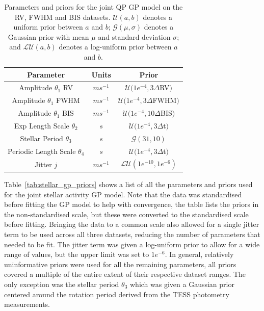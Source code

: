 \begin{table}[htb]
    \centering
    \begin{tabular}{ccc}
        \toprule
        \toprule
        Parameter & Units & Prior \\
        \midrule
        Amplitude $\theta_{1}$ RV & $ms^{-1}$ & $\mathcal{U}(1e^{-4}, 3 \Delta$RV$)$ \\
        \addlinespace
        Amplitude $\theta_{1}$ FWHM & $ms^{-1}$ & $\mathcal{U}(1e^{-4}, 3 \Delta$FWHM$)$  \\
        \addlinespace
        Amplitude $\theta_{1}$ BIS & $ms^{-1}$ & $\mathcal{U}(1e^{-4}, 10 \Delta$BIS$)$ \\
        \addlinespace
        Exp Length Scale $\theta_{2}$ & $s$ & $\mathcal{U}(1e^{-4}, 3 \Delta$t$)$ \\
        \addlinespace
        Stellar Period $\theta_{3}$ & $s$ & $\mathcal{G}(31, 10)$ \\
        \addlinespace
        Periodic Length Scale $\theta_{4}$ & $s$ & $\mathcal{U}(1e^{-4}, 3 \Delta$t$)$ \\
        \addlinespace
        Jitter $j$ & $ms^{-1}$ & $\mathcal{LU}(1e^{-10}, 1e^{-6})$ \\
        \bottomrule
    \end{tabular}
    \caption{Parameters and priors for the joint QP GP model on the RV, FWHM and BIS datasets.
    $\mathcal{U}(a, b)$ denotes a uniform prior between $a$ and $b$; $\mathcal{G}(\mu, \sigma)$ denotes a Gaussian prior
    with mean $\mu$ and standard deviation $\sigma$; and $\mathcal{LU}(a, b)$ denotes a log-uniform prior between $a$ and $b$.}
    \label{tab:stellar_gp_priors}
\end{table}

Table~\eqref{tab:stellar_gp_priors} shows a list of all the parameters and priors used for the joint stellar activity
GP model.
Note that the data was standardised before fitting the GP model to help with convergence, the table lists the priors
in the non-standardised scale, but these were converted to the standardised scale before fitting.
Bringing the data to a common scale also allowed for a single jitter term to be used across all three datasets, reducing
the number of parameters that needed to be fit.
The jitter term was given a log-uniform prior to allow for a wide range of values, but the upper limit was set to $1e^{-6}$.
In general, relatively uninformative priors were used for all the remaining parameters, all priors covered a multiple of the entire
extent of their respective dataset ranges.
The only exception was the stellar period $\theta_{3}$ which was given a Gaussian prior centered around the rotation
period derived from the TESS photometry measurements.

